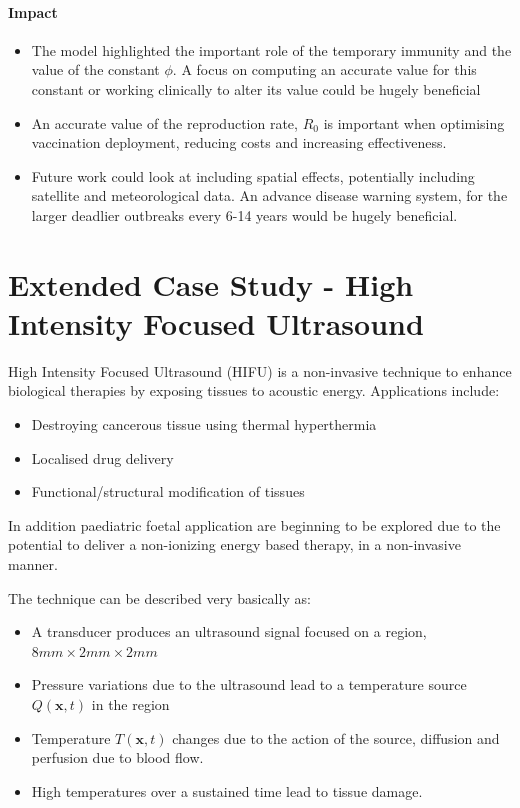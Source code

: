 \documentclass[11pt]{article} %
\begin{document}
\paragraph{Impact}

\begin{itemize}
	\item The model highlighted the important role of the temporary immunity and the value of the constant $\phi$. A focus on computing an accurate value for this constant or working clinically to alter its value could be hugely beneficial
	\item An accurate value of the reproduction rate, $ R_0 $ is important when optimising vaccination deployment, reducing costs and increasing effectiveness. 
	\item Future work could look at including spatial effects, potentially including satellite and meteorological data. An advance disease warning system, for the larger deadlier outbreaks every 6-14 years would be hugely beneficial. 
\end{itemize}
	\pagebreak
	\section{Extended Case Study - High Intensity Focused Ultrasound \label{extended}}
	
	High Intensity Focused Ultrasound (HIFU) is a non-invasive technique to enhance biological therapies by exposing tissues to acoustic energy. Applications include:
	\begin{itemize}
		\item Destroying cancerous tissue using thermal hyperthermia 
		\item Localised drug delivery 
		\item Functional/structural modification of tissues
	\end{itemize}
In addition paediatric foetal application are beginning to be explored due to the potential to deliver a non-ionizing energy based therapy, in a non-invasive manner. 

The technique can be described very basically as: 
	\begin{itemize}
		\item A transducer produces an ultrasound signal focused on a region, $8 mm\times2 mm\times2 mm$
		\item Pressure variations due to the ultrasound lead to a temperature source $Q(\textbf{x},t)$ in the region
		\item Temperature $T(\textbf{x},t)$ changes due to the action of the source, diffusion and perfusion due to blood flow. 
		\item High temperatures over a sustained time lead to tissue damage. 
	\end{itemize}
	
\end{document}
